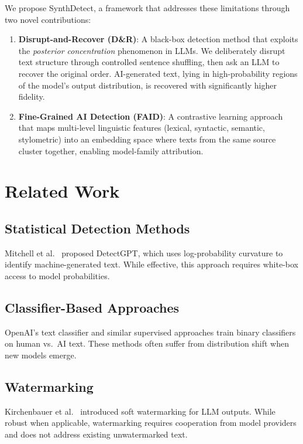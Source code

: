 \documentclass[conference]{IEEEtran}
\begin{document}
We propose SynthDetect, a framework that addresses these limitations
through two novel contributions:

\begin{enumerate}
    \item \textbf{Disrupt-and-Recover (D\&R)}: A black-box detection method
    that exploits the \textit{posterior concentration} phenomenon in LLMs.
    We deliberately disrupt text structure through controlled sentence
    shuffling, then ask an LLM to recover the original order. AI-generated
    text, lying in high-probability regions of the model's output
    distribution, is recovered with significantly higher fidelity.

    \item \textbf{Fine-Grained AI Detection (FAID)}: A contrastive learning
    approach that maps multi-level linguistic features (lexical, syntactic,
    semantic, stylometric) into an embedding space where texts from the same
    source cluster together, enabling model-family attribution.
\end{enumerate}

\section{Related Work}

\subsection{Statistical Detection Methods}
Mitchell et al.\ \cite{mitchell2023} proposed DetectGPT, which uses
log-probability curvature to identify machine-generated text. While
effective, this approach requires white-box access to model probabilities.

\subsection{Classifier-Based Approaches}
OpenAI's text classifier \cite{solaiman2019} and similar supervised
approaches train binary classifiers on human vs.\ AI text. These methods
often suffer from distribution shift when new models emerge.

\subsection{Watermarking}
Kirchenbauer et al.\ \cite{kirchenbauer2023} introduced soft watermarking
for LLM outputs. While robust when applicable, watermarking requires
cooperation from model providers and does not address existing unwatermarked text.
\end{document}
